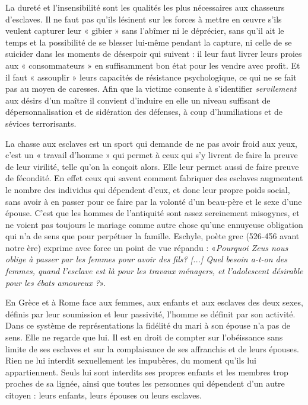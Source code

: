  La dureté et l'insensibilité sont les qualités les plus nécessaires aux chasseurs d'esclaves. Il ne faut pas qu'ils lésinent sur les forces à mettre en œuvre s'ils veulent capturer leur « gibier » sans l'abîmer ni le déprécier, sans qu'il ait le temps et la possibilité de se blesser lui-même pendant la capture, ni celle de se suicider dans les moments de désespoir qui suivent : il leur faut livrer leurs proies aux « consommateurs » en suffisamment bon état pour les vendre avec profit. Et il faut « assouplir » leurs capacités de résistance psychologique, ce qui ne se fait pas au moyen de caresses. Afin que la victime consente à s'identifier \emph{servilement} aux désirs d'un maître il convient d'induire en elle un niveau suffisant de dépersonnalisation et de sidération des défenses, à coup d'humiliations et de sévices terrorisants. 

 La chasse aux esclaves est un sport qui demande de ne pas avoir froid aux yeux, c'est un « travail d'homme » qui permet à ceux qui s'y livrent de faire la preuve de leur virilité, telle qu'on la conçoit alors. Elle leur permet aussi de faire preuve de fécondité. En effet ceux qui savent comment fabriquer des esclaves augmentent le nombre des individus qui dépendent d'eux, et donc leur propre poids social, sans avoir à en passer pour ce faire par la volonté d'un beau-père et le sexe d'une épouse. C'est que les hommes de l'antiquité sont assez sereinement misogynes, et ne voient pas toujours le mariage comme autre chose qu'une ennuyeuse obligation qui n'a de sens que pour perpétuer la famille. Eschyle, poète grec (526-456 avant notre ère) exprime avec force un point de vue répandu : «\emph{Pourquoi Zeus nous oblige à passer par les femmes pour avoir des fils? [...] Quel besoin a-t-on des femmes, quand l’esclave est là pour les travaux ménagers, et l’adolescent désirable pour les ébats amoureux ?}». 

 En Grèce et à Rome face aux femmes, aux enfants et aux esclaves des deux sexes, définis par leur soumission et leur passivité, l'homme se définit par son activité. Dans ce système de représentations la fidélité du mari à son épouse n'a pas de sens. Elle ne regarde que lui. Il est en droit de compter sur l'obéissance sans limite de ses esclaves et sur la complaisance de ses affranchis et de leurs épouses. Rien ne lui interdit sexuellement les impubères, du moment qu'ils lui appartiennent. Seuls lui sont interdits ses propres enfants et les membres trop proches de sa lignée, ainsi que toutes les personnes qui dépendent d'un autre citoyen : leurs enfants, leurs épouses ou leurs esclaves.


